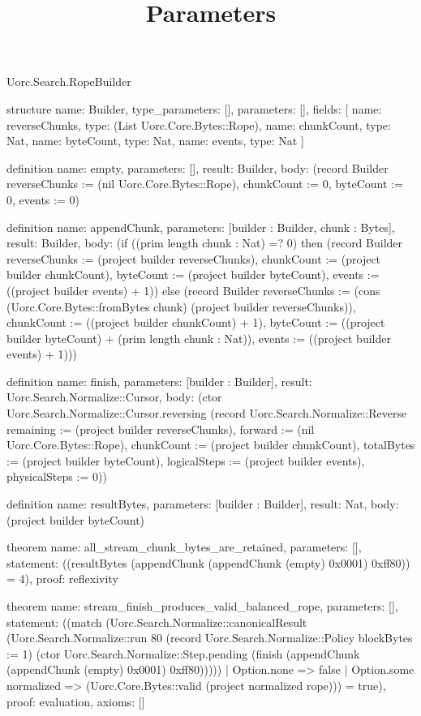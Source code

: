 \begin{lexlean}{Uorc.Search.RopeBuilder}
\title{Parameters}
\begin{semanticmodule}
structure{
  name: Builder,
  type_parameters: [],
  parameters: [],
  fields: [
    {name: reverseChunks, type: (List Uorc.Core.Bytes::Rope)},
    {name: chunkCount, type: Nat},
    {name: byteCount, type: Nat},
    {name: events, type: Nat}
  ]
}

definition{
  name: empty,
  parameters: [],
  result: Builder,
  body: (record Builder {reverseChunks := (nil Uorc.Core.Bytes::Rope), chunkCount := 0, byteCount := 0, events := 0})
}

definition{
  name: appendChunk,
  parameters: [builder : Builder, chunk : Bytes],
  result: Builder,
  body: (if ((prim length chunk : Nat) =? 0) then (record Builder {reverseChunks := (project builder reverseChunks), chunkCount := (project builder chunkCount), byteCount := (project builder byteCount), events := ((project builder events) + 1)}) else (record Builder {reverseChunks := (cons (Uorc.Core.Bytes::fromBytes chunk) (project builder reverseChunks)), chunkCount := ((project builder chunkCount) + 1), byteCount := ((project builder byteCount) + (prim length chunk : Nat)), events := ((project builder events) + 1)}))
}

definition{
  name: finish,
  parameters: [builder : Builder],
  result: Uorc.Search.Normalize::Cursor,
  body: (ctor Uorc.Search.Normalize::Cursor.reversing (record Uorc.Search.Normalize::Reverse {remaining := (project builder reverseChunks), forward := (nil Uorc.Core.Bytes::Rope), chunkCount := (project builder chunkCount), totalBytes := (project builder byteCount), logicalSteps := (project builder events), physicalSteps := 0}))
}

definition{
  name: resultBytes,
  parameters: [builder : Builder],
  result: Nat,
  body: (project builder byteCount)
}

theorem{
  name: all_stream_chunk_bytes_are_retained,
  parameters: [],
  statement: ((resultBytes (appendChunk (appendChunk (empty) 0x0001) 0xff80)) = 4),
  proof: reflexivity{}
}

theorem{
  name: stream_finish_produces_valid_balanced_rope,
  parameters: [],
  statement: ((match (Uorc.Search.Normalize::canonicalResult (Uorc.Search.Normalize::run 80 (record Uorc.Search.Normalize::Policy {blockBytes := 1}) (ctor Uorc.Search.Normalize::Step.pending (finish (appendChunk (appendChunk (empty) 0x0001) 0xff80)))))
    | Option.none => false
    | Option.some normalized => (Uorc.Core.Bytes::valid (project normalized rope))) = true),
  proof: evaluation{},
  axioms: []
}
\end{semanticmodule}
\end{lexlean}
